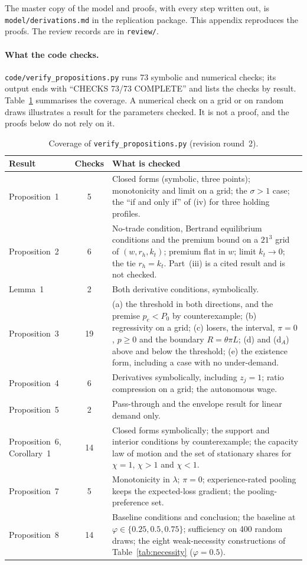 \documentclass[12pt]{article}
\theoremstyle{remark}
\begin{document}
The master copy of the model and proofs, with every step written out, is \texttt{model/derivations.md} in the replication package. This appendix reproduces the proofs. The review records are in \texttt{review/}.

\paragraph{What the code checks.} \texttt{code/verify\_propositions.py} runs 73 symbolic and numerical checks; its output ends with ``CHECKS 73/73 COMPLETE'' and lists the checks by result. Table~\ref{tab:coverage} summarises the coverage. A numerical check on a grid or on random draws illustrates a result for the parameters checked. It is not a proof, and the proofs below do not rely on it.

\begin{table}[h]\centering\small
\caption{Coverage of \texttt{verify\_propositions.py} (revision round~2).}\label{tab:coverage}
\begin{tabular}{p{}cp{}}
\toprule
Result & Checks & What is checked\\
\midrule
Proposition~1 & 5 & Closed forms (symbolic, three points); monotonicity and limit on a grid; the $\sigma>1$ case; the ``if and only if'' of (iv) for three holding profiles.\\
Proposition~2 & 6 & No-trade condition, Bertrand equilibrium conditions and the premium bound on a $21^3$ grid of $(w,r_h,k_t)$; premium flat in $w$; limit $k_t\to0$; the tie $r_h=k_t$. Part~(iii) is a cited result and is not checked.\\
Lemma~1 & 2 & Both derivative conditions, symbolically.\\
Proposition~3 & 19 & (a) the threshold in both directions, and the premise $p_e<P_0$ by counterexample; (b) regressivity on a grid; (c) losers, the interval, $\pi=0$, $p\ge0$ and the boundary $R=\theta\pi L$; (d) and (d$_A$) above and below the threshold; (e) the existence form, including a case with no under-demand.\\
Proposition~4 & 6 & Derivatives symbolically, including $z_j=1$; ratio compression on a grid; the autonomous wage.\\
Proposition~5 & 2 & Pass-through and the envelope result for linear demand only.\\
Proposition~6, Corollary~1 & 14 & Closed forms symbolically; the support and interior conditions by counterexample; the capacity law of motion and the set of stationary shares for $\chi=1$, $\chi>1$ and $\chi<1$.\\
Proposition~7 & 5 & Monotonicity in $\lambda$; $\pi=0$; experience-rated pooling keeps the expected-loss gradient; the pooling-preference set.\\
Proposition~8 & 14 & Baseline conditions and conclusion; the baseline at $\varphi\in\{0.25,0.5,0.75\}$; sufficiency on 400 random draws; the eight weak-necessity constructions of Table~\ref{tab:necessity} ($\varphi=0.5$).\\
\bottomrule
\end{tabular}
\end{table}
\end{document}
